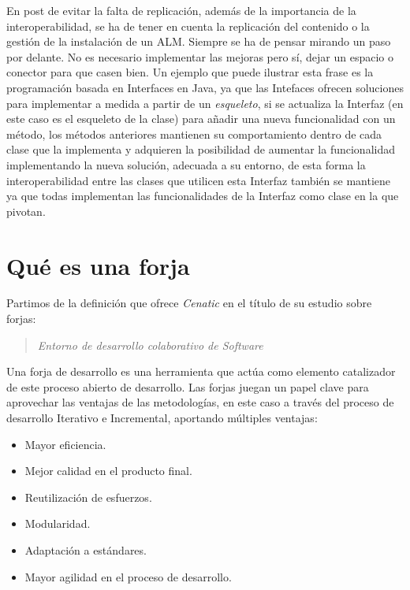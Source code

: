 \par En post de evitar la falta de replicación, además de la importancia de la interoperabilidad, se ha de tener en cuenta la replicación del contenido o la gestión de la instalación de un ALM. Siempre se ha de pensar mirando un paso por delante. No es necesario implementar las mejoras pero sí, dejar un espacio o conector para que casen bien. Un ejemplo que puede ilustrar esta frase es la programación basada en Interfaces en Java, ya que las Intefaces ofrecen soluciones para implementar a medida a partir de un \emph{esqueleto}, si se actualiza la Interfaz (en este caso es el esqueleto de la clase) para añadir una nueva funcionalidad con un método, los métodos anteriores mantienen su comportamiento dentro de cada clase que la implementa y adquieren la posibilidad de aumentar la funcionalidad implementando la nueva solución, adecuada a su entorno, de esta forma la interoperabilidad entre las clases que utilicen esta Interfaz también se mantiene ya que todas implementan las funcionalidades de la Interfaz como clase en la que pivotan.


\section{Qué es una forja}
\label{sec:que-es}

\par Partimos de la definición que ofrece \emph{Cenatic} en el título de su estudio sobre forjas:

\begin{quote}
    \emph{Entorno de desarrollo colaborativo de Software}
\end{quote}

\par Una forja de desarrollo es una herramienta que actúa como elemento catalizador de este proceso abierto de desarrollo. Las forjas juegan un papel clave para aprovechar las ventajas de las metodologías, en este caso a través del proceso de desarrollo Iterativo e Incremental, aportando múltiples ventajas:

\begin{itemize}
	\item Mayor eficiencia.
	\item Mejor calidad en el producto final.
	\item Reutilización de esfuerzos.
	\item Modularidad.
	\item Adaptación a estándares.
	\item Mayor agilidad en el proceso de desarrollo.
\end{itemize}

